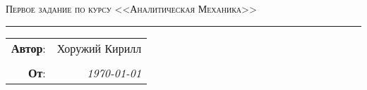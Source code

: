 
\begin{center}
    \LARGE \textsc{Первое задание по курсу <<Аналитическая Механика>>}
\end{center}

\hrule

\phantom{42}

\begin{flushright}
    \begin{tabular}{rr}
        \textbf{Автор}: 
        & Хоружий Кирилл \\
        &\\
        \textbf{От}: &
        \textit{\today}\\
    \end{tabular}
\end{flushright}

\thispagestyle{empty}
